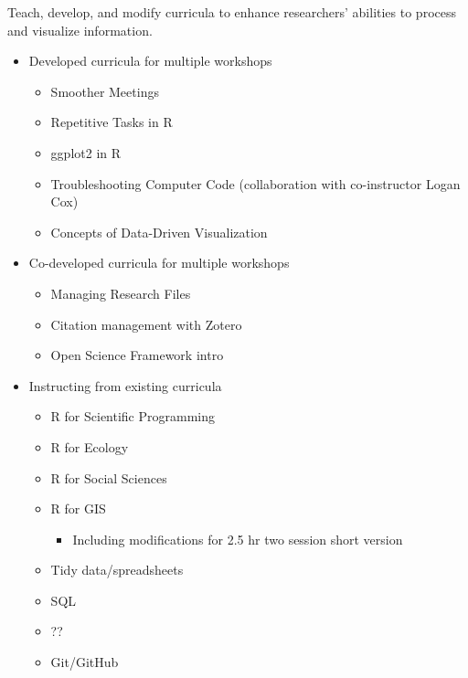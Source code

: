 \documentclass[
  letterpaper,
  DIV=11,
  numbers=noendperiod,
  oneside]{scrreprt}
\providecommand{\tightlist}{%
  \setlength{\itemsep}{0pt}\setlength{\parskip}{0pt}}\usepackage{longtable,booktabs,array}
\begin{document}
Teach, develop, and modify curricula to enhance researchers' abilities
to process and visualize information.


\begin{itemize}
\tightlist
\item
  Developed curricula for multiple workshops

  \begin{itemize}
  \tightlist
  \item
    Smoother Meetings
  \item
    Repetitive Tasks in R
  \item
    ggplot2 in R
  \item
    Troubleshooting Computer Code (collaboration with co-instructor
    Logan Cox)
  \item
    Concepts of Data-Driven Visualization
  \end{itemize}
\item
  Co-developed curricula for multiple workshops

  \begin{itemize}
  \tightlist
  \item
    Managing Research Files
  \item
    Citation management with Zotero
  \item
    Open Science Framework intro
  \end{itemize}
\item
  Instructing from existing curricula

  \begin{itemize}
  \tightlist
  \item
    R for Scientific Programming
  \item
    R for Ecology
  \item
    R for Social Sciences
  \item
    R for GIS

    \begin{itemize}
    \tightlist
    \item
      Including modifications for 2.5 hr two session short version
    \end{itemize}
  \item
    Tidy data/spreadsheets
  \item
    SQL
  \item
    ??
  \item
    Git/GitHub


\end{itemize}
\end{itemize}
\end{document}
